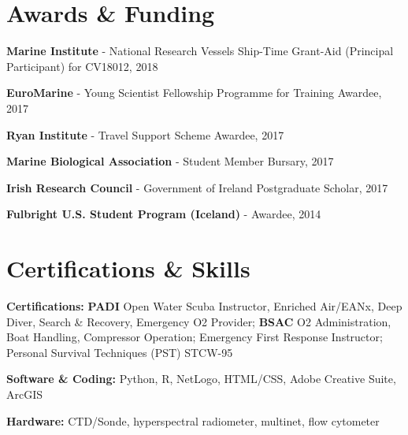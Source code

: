\documentclass[a4paper]{deedy-resume} %
\begin{document}
\begin{flushleft}


\section{Awards \& Funding}
\sectionspace

\begin{tightitemize}
\item \textbf{Marine Institute} - National Research Vessels Ship-Time Grant-Aid (Principal Participant) for CV18012, 2018
\item \textbf{EuroMarine} - Young Scientist Fellowship Programme for Training Awardee, 2017
\item \textbf{Ryan Institute} - Travel Support Scheme Awardee, 2017
\item \textbf{Marine Biological Association} - Student Member Bursary, 2017
\item \textbf{Irish Research Council} - Government of Ireland Postgraduate Scholar, 2017
\item \textbf{Fulbright U.S. Student Program (Iceland)} - Awardee, 2014
\end{tightitemize}

\sectionspace %



\section{Certifications \& Skills}
\sectionspace

\begin{tightitemize}
\item \textbf{Certifications:} \textbf{PADI} Open Water Scuba Instructor, Enriched Air/EANx, Deep Diver, Search \& Recovery, Emergency O2 Provider; \textbf{BSAC} O2 Administration, Boat Handling, Compressor Operation; Emergency First Response Instructor; Personal Survival Techniques (PST) STCW-95 %
\item \textbf{Software \& Coding:} Python, R, NetLogo, HTML/CSS, Adobe Creative Suite, ArcGIS
\item \textbf{Hardware:} CTD/Sonde, hyperspectral radiometer, multinet, flow cytometer
\end{tightitemize}


\end{flushleft}
\end{document}

